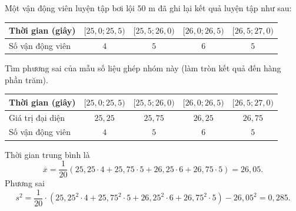 \begin{ex}[Mức độ 2]%
Một vận động viên luyện tập bơi lội $50$ m đã ghi lại kết quả luyện tập như sau:
\begin{center}
\begin{tabular}{|l|c|c|c|c|}
\hline Thời gian (giây) & {$[25{,}0; 25{,}5)$} & {$[25{,}5; 26{,}0)$} & {$[26{,}0; 26{,}5)$} & {$[26{,}5; 27{,}0)$} \\
\hline Số vận động viên & $4$ & $5$ & $6$ & $5$ \\
\hline
\end{tabular}
\end{center}
Tìm phương sai của mẫu số liệu ghép nhóm này (làm tròn kết quả đến hàng phần trăm).
\loigiai
{
\begin{center}
\begin{tabular}{|l|c|c|c|c|}
\hline Thời gian (giây) & {$[25{,}0; 25{,}5)$} & {$[25{,}5; 26{,}0)$} & {$[26{,}0; 26{,}5)$} & {$[26{,}5; 27{,}0)$} \\
\hline Giá trị đại diện & $25{,}25$ & $25{,}75$ & $26{,}25$ & $26{,}75$ \\
\hline Số vận động viên & $4$ & $5$ & $6$ & $5$ \\
\hline
\end{tabular}
\end{center}
Thời gian trung bình là
$$\overline{x}=\dfrac{1}{20}(25{,}25\cdot4+25{,}75\cdot5+26{,}25\cdot6+26{,}75\cdot5)=26{,}05.$$
Phương sai
$$s^2=\dfrac{1}{20}\cdot\left(25{,}25^2\cdot4+25{,}75^2\cdot5+26{,}25^2\cdot6+26{,}75^2\cdot5\right)-26{,}05^2=0{,}285.$$
}
\end{ex}

